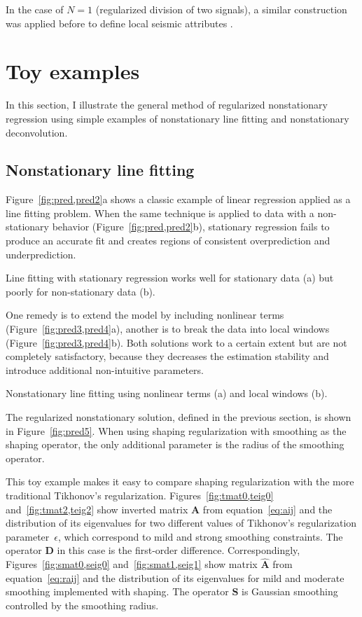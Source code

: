 In the case of $N=1$ (regularized division of two signals), a similar
construction was applied before to define local seismic
attributes \cite[]{attr}.

\section{Toy examples}

In this section, I illustrate the general method of regularized
nonstationary regression using simple examples of nonstationary line
fitting and nonstationary deconvolution.

\subsection{Nonstationary line fitting}

Figure~\ref{fig:pred,pred2}a shows a classic example of linear regression
applied as a line fitting problem. When the same technique is applied
to data with a non-stationary behavior (Figure~\ref{fig:pred,pred2}b),
stationary regression fails to produce an accurate fit and creates
regions of consistent overprediction and underprediction.

 {Line fitting with
  stationary regression works well for stationary data (a) but poorly
  for non-stationary data (b).}

One remedy is to extend the model by including nonlinear terms
(Figure~\ref{fig:pred3,pred4}a), another is to break the data into local
windows (Figure~\ref{fig:pred3,pred4}b). Both solutions work to a certain
extent but are not completely satisfactory, because they decreases the
estimation stability and introduce additional non-intuitive
parameters.

{Nonstationary line fitting using nonlinear terms (a) and local windows (b).}

The regularized nonstationary solution, defined in the previous
section, is shown in Figure~\ref{fig:pred5}. When using shaping
regularization with smoothing as the shaping operator, the only
additional parameter is the radius of the smoothing operator.


This toy example makes it easy to compare shaping regularization with
the more traditional Tikhonov's
regularization. Figures~\ref{fig:tmat0,teig0}
and~\ref{fig:tmat2,teig2} show inverted matrix $\mathbf{A}$ from
equation~\ref{eq:aij} and the distribution of its eigenvalues for two
different values of Tikhonov's regularization parameter~$\epsilon$,
which correspond to mild and strong smoothing constraints. The
operator $\mathbf{D}$ in this case is the first-order
difference. Correspondingly, Figures~\ref{fig:smat0,seig0}
and~\ref{fig:smat1,seig1} show matrix $\widehat{\mathbf{A}}$ from
equation~\ref{eq:raij} and the distribution of its eigenvalues for
mild and moderate smoothing implemented with shaping. The operator
$\mathbf{S}$ is Gaussian smoothing controlled by the 
smoothing radius.  

